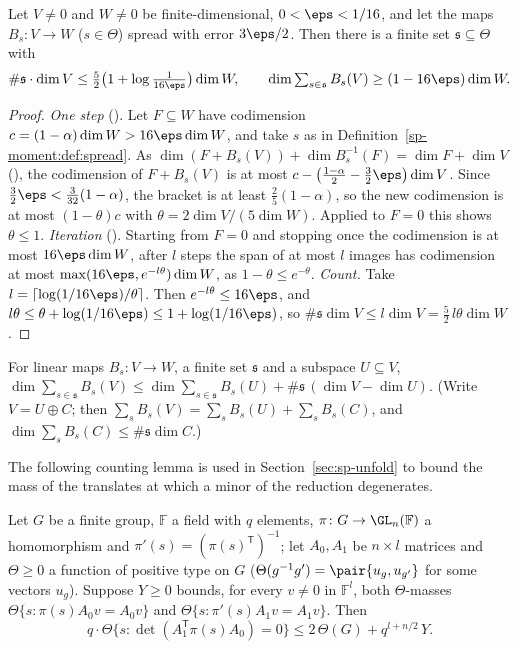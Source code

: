 \begin{proposition}
\label{sp-moment:prop:few}
Let $V\ne0$ and $W\ne0$ be finite-dimensional, $0<\eps<1/16$, and let the maps
$B_s\colon V\to W$ ($s\in\Theta$) spread with error $3\eps/2$. Then there is a finite set
$\mathfrak s\subseteq\Theta$ with
\[
\#\mathfrak s\cdot\dim V\le\tfrac52\bigl(1+\log\tfrac1{16\eps}\bigr)\dim W,\qquad
\dim\textstyle\sum_{s\in \mathfrak s}B_s(V)\ge(1-16\eps)\dim W.
\]
\end{proposition}

\begin{proof}
\emph{One step} (). Let $F\subseteq W$ have codimension
$c=(1-\alpha)\dim W>16\eps\dim W$, and take $s$ as in Definition~\ref{sp-moment:def:spread}. As
$\dim(F+B_s(V))+\dim B_s^{-1}(F)=\dim F+\dim V$
(), the codimension of $F+B_s(V)$ is at most
$c-\bigl(\frac{1-\alpha}2-\frac32\eps\bigr)\dim V$. Since $\frac32\eps<\frac3{32}(1-\alpha)$, the
bracket is at least $\frac25(1-\alpha)$, so the new codimension is at most $(1-\theta)c$ with
$\theta=2\dim V/(5\dim W)$. Applied to $F=0$ this shows $\theta\le1$.
\emph{Iteration} (). Starting from $F=0$ and stopping once
the codimension is at most $16\eps\dim W$, after $l$ steps the span of at most $l$ images has
codimension at most $\max(16\eps,e^{-l\theta})\dim W$, as $1-\theta\le e^{-\theta}$.
\emph{Count.} Take $l=\lceil\log(1/16\eps)/\theta\rceil$. Then $e^{-l\theta}\le16\eps$, and
$l\theta\le\theta+\log(1/16\eps)\le1+\log(1/16\eps)$, so
$\#\mathfrak s\dim V\le l\dim V=\frac52\,l\theta\dim W$.
\end{proof}

\begin{lemma}\label{sp-moment:lem:restrict}
For linear maps $B_s\colon V\to W$, a finite set $\mathfrak s$ and a subspace $U\subseteq V$,
$\dim\sum_{s\in \mathfrak s}B_s(V)\le\dim\sum_{s\in \mathfrak s}B_s(U)+\#\mathfrak s\,(\dim V-\dim U)$. (Write $V=U\oplus C$;
then $\sum_sB_s(V)=\sum_sB_s(U)+\sum_sB_s(C)$, and $\dim\sum_sB_s(C)\le\#\mathfrak s\dim C$.)
\end{lemma}

The following counting lemma is used in Section~\ref{sec:sp-unfold} to bound the mass of the
translates at which a minor of the reduction degenerates.

\begin{lemma}\label{sp-moment:lem:positive}
Let $G$ be a finite group, $\mathbb F$ a field with $q$ elements, $\pi\colon G\to\GL_n(\mathbb F)$
a homomorphism and $\pi'(s)=(\pi(s)^{\mathsf T})^{-1}$; let $A_0,A_1$ be $n\times l$ matrices and
$\Theta\ge0$ a function of positive type on $G$ ($\Theta(g^{-1}g')=\pair{u_g,u_{g'}}$ for some vectors
$u_g$). Suppose $Y\ge0$ bounds, for every $v\ne0$ in $\mathbb F^l$, both $\Theta$-masses
$\Theta\{s:\pi(s)A_0v=A_0v\}$ and $\Theta\{s:\pi'(s)A_1v=A_1v\}$. Then
\[
q\cdot\Theta\{s:\det(A_1^{\mathsf T}\pi(s)A_0)=0\}\le2\,\Theta(G)+q^{l+n/2}\,Y.
\]
\end{lemma}

